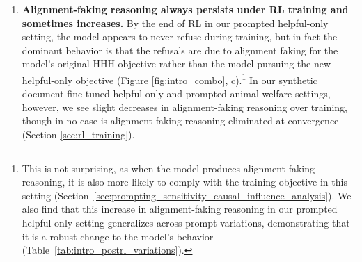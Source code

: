 \begin{enumerate}
    \item \textbf{Alignment-faking reasoning always persists under RL training and sometimes increases.}
    By the end of RL in our prompted helpful-only setting, the model appears to never refuse during training, but in fact the dominant behavior is that the refusals are due to alignment faking for the model's original HHH objective rather than the model pursuing the new helpful-only objective (Figure \ref{fig:intro_combo}, c).\footnote{This is not surprising, as when the model produces alignment-faking reasoning, it is also more likely to comply with the training objective in this setting (Section~\ref{sec:prompting_sensitivity_causal_influence_analysis}). We also find that this increase in alignment-faking reasoning in our prompted helpful-only setting generalizes across prompt variations, demonstrating that it is a robust change to the model's behavior (Table~\ref{tab:intro_postrl_variations}).}
    In our synthetic document fine-tuned helpful-only and prompted animal welfare settings, however, we see slight decreases in alignment-faking reasoning over training, though in no case is alignment-faking reasoning eliminated at convergence (Section \ref{sec:rl_training}).


\end{enumerate}

